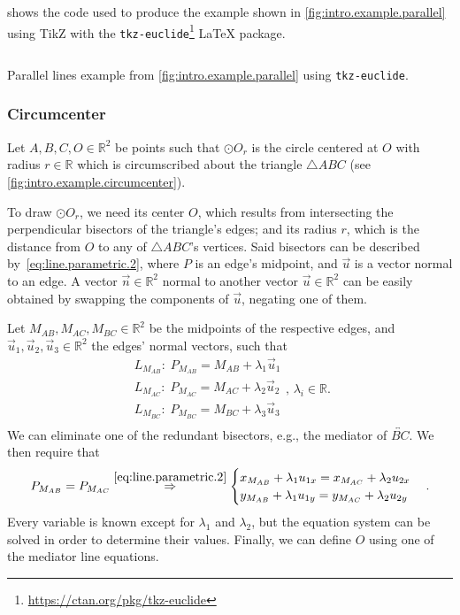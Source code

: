  shows the code used to produce the
example shown in \cref{fig:intro.example.parallel} using \ac{TikZ} with the
\texttt{tkz-euclide}\footnote{\url{https://ctan.org/pkg/tkz-euclide}} \LaTeX{}
package.

\begin{listing}[htb]
  \inputminted{latex}{tikz/ex-parallel.tikz}
  \caption[Parallel lines example using \texttt{tkz-euclide}]{
    Parallel lines example from \cref{fig:intro.example.parallel} using
    \texttt{tkz-euclide}.}%
  \label{lst:intro.example.parallel.tikz}
\end{listing}

\subsubsection{Circumcenter}%
\label{sec:intro.examples.circumcenter}

Let $A, B, C, O \in \mathbb{R}^2$ be points such that $\odot O_r$ is the circle
centered at $O$ with radius $r \in \mathbb{R}$ which is circumscribed about the
triangle $\triangle ABC$ (see \cref{fig:intro.example.circumcenter}).

To draw $\odot O_r$, we need its center $O$, which results from intersecting the
perpendicular bisectors of the triangle's edges; and its radius $r$, which is
the distance from $O$ to any of $\triangle ABC$'s vertices.  Said bisectors can
be described by~\cref{eq:line.parametric.2}, where $P$ is an edge's midpoint,
and $\vec{u}$ is a vector normal to an edge.  A vector $\vec{n} \in
\mathbb{R}^2$ normal to another vector $\vec{u} \in \mathbb{R}^2$ can be easily
obtained by swapping the components of $\vec{u}$, negating one of them.

Let $M_{AB}, M_{AC}, M_{BC} \in \mathbb{R}^2$ be the midpoints of the respective
edges, and $\vec{u}_1, \vec{u}_2, \vec{u}_3 \in \mathbb{R}^2$ the edges' normal
vectors, such that
\[
  \begin{split}
    L_{M_{AB}}\!:\; P_{M_{AB}} = M_{AB} + \lambda_1 \vec{u}_1 \\
    L_{M_{AC}}\!:\; P_{M_{AC}} = M_{AC} + \lambda_2 \vec{u}_2 \\
    L_{M_{BC}}\!:\; P_{M_{BC}} = M_{BC} + \lambda_3 \vec{u}_3 \\
  \end{split},\,\lambda_i \in \mathbb{R}.
\]
We can eliminate one of the redundant bisectors, e.g., the mediator of
$\overleftrightarrow{BC}$.  We then require that
\[
  P_{M_{AB}} = P_{M_{AC}} \stackrel{\eqref{eq:line.parametric.2}}{\Rightarrow}
  \begin{cases}
    x_{M_{AB}} + \lambda_1 u_{1x} = x_{M_{AC}} + \lambda_2 u_{2x} \\
    y_{M_{AB}} + \lambda_1 u_{1y} = y_{M_{AC}} + \lambda_2 u_{2y} \\
  \end{cases}.
\]
Every variable is known except for $\lambda_1$ and $\lambda_2$, but the equation
system can be solved in order to determine their values.  Finally, we can define
$O$ using one of the mediator line equations.

